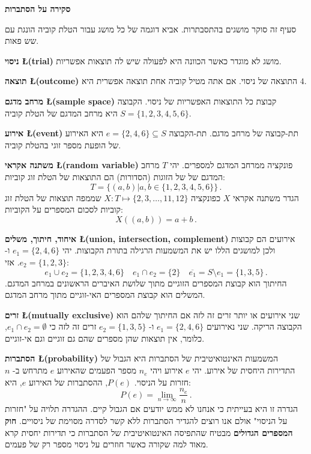 

\newpage

\begin{center}
\textbf{\LARGE סקירה על הסתברות}
\end{center}

סעיף זה סוקר מושגים בהתסבתרות. אביא דוגמה של כל מושג עבור הטלת קוביה הונגת עם שש פאות. 

\textbf{ניסוי \L{\small (trial)}}
מושג לא מוגדר כאשר הכוונה היא לפעולה שיש לה תוצאות אפשריות.

\textbf{תוצאה \L{\small (outcome)}} 
התוצאה של ניסוי. אם אתה מטיל קוביה אחת תוצאה אפשרית היא 
$4$.

\textbf{מרחב מדגם \L{\small (sample space)}}
קבוצת כל התוצאות האפשריות של ניסוי. הקבוצה 
$S=\{1,2,3,4,5,6\}$
היא מרחב המדגם של הטלת קוביה.

\textbf{אירוע \L{\small (event)}}
תת-קבוצה של מרחב מדגם. תת-הקבוצה 
$e=\{2,4,6\}\subseteq S$
היא האירוע של הופעת מספר זוגי בהטלת קוביה.

\textbf{משתנה אקראי \L{\small (random variable)}}
פונקציה ממרחב המדגם למספרים. יהי 
$T$
מרחב המדגם של של הזוגות (הסדורות) הם התוצאות של הטלת זוג קוביות:
\[
T=\{(a,b)| a,b\in \{1,2,3,4,5,6\} \}\,.
\]
הגדר משתנה אקראי 
$X$
כפונקציה
$X:T \mapsto \{2,3,\ldots,11,12\}$
שממפה תוצאות של הטלת זוג קוביות לסכום המספרים על הקוביות:
\begin{equation}\label{eq.sum}
X((a,b)) = a+b\,.
\end{equation}

\textbf{איחוד, חיתוך, משלים \L{\small (union, intersection, complement)}} 
אירועים הם קבוצות ולכן למושגים הללו יש את המשמעות הרגילה בתורת הקבוצות. יהי
$e_1=\{2,4,6\}$
ו-%
$e_2=\{1,2,3\}$. 
אזי:
\[
e_1 \cup e_2=\{1,2,3,4,6\}\quad e_1 \cap e_2=\{2\}\quad \overline{e_1} = S\setminus e_1=\{1,3,5\}\,.
\]
החיתוך הוא קבוצת המספרים הזוגיים מתוך שלושת האיברים הראשונים במרחב המדגם. המשלים הוא קבוצת המספרים האי-זוגיים מתוך מרחב המדגם.

\textbf{זרים \L{\small (mutually exclusive)}} 
שני אירועים או יותר זרים זה לזה אם החיתוך שלהם הוא הקבוצה הריקה. שני נאירועים
$e_1=\{2,4,6\}$
ו-%
$e_2=\{1,3,5\}$
זרים זה לזה כי
$e_1 \cap e_2=\emptyset$,
כלומר, אין תוצאות שהן מספרים שהם גם זוגיים וגם אי-זוגיים.

\textbf{הסתברות \L{\small (probability)}}
המשמעות האינטואיטיבית של הסתברות היא הגבול של התדירות היחסית של אירוע. יהי
$e$ 
אירוע ויהי
$n_e$
מספר הפעמים שהאירוע 
$e$
מתרחש ב-%
$n$
חזרות על הניסוי. 
$P(e)$,
ההסתברות של האירוע
$e$,
היא:
\[
P(e) = \lim_{n\rightarrow \infty} \frac{n_e}{n}\,.
\]
הגדרה זו היא בעייתית כי אנחנו לא ממש יודעים אם הגבול קיים. ההגדרה תלויה על "חזרות על הניסוי" אולם אנו רוצים להגדיר הסתברות ללא קשר לסדרה מסוימת של ניסויים. 
\textbf{חוק המספרים הגדולים}
מבטיח שהתפיסה האינטואיטיבית של הסתברות כי תדירות יחסית קרא מאוד למה שקורה כאשר חוזרים על ניסוי מספר רק של פעמים.

